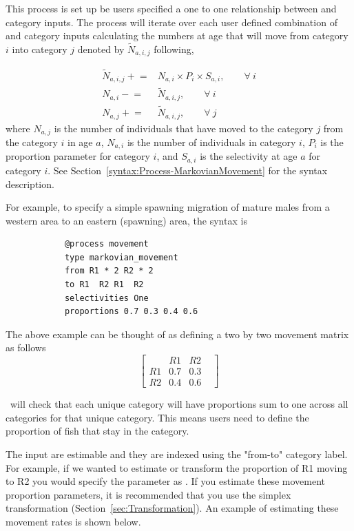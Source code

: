 This process is set up be users specified a one to one relationship between  and  category inputs. The process will iterate over each user defined combination of  and  category inputs calculating the numbers at age that will move from category \(i\) into category \(j\) denoted by \(\tilde{N}_{a,i,j}\) following,

\begin{align}
	\tilde{N}_{a,i,j} \mathrel{+}=& N_{a,i} \times P_i \times S_{a,i}, \qquad \forall \ i \\
	N_{a,i} \mathrel{-}=& \tilde{N}_{a,i,j}, \qquad \forall \ i \\
	N_{a,j} \mathrel{+}=& \tilde{N}_{a,i,j}, \qquad \forall \ j
\end{align}
where $N_{a,j}$ is the number of individuals that have moved to the  category $j$ from the  category $i$ in age $a$, $N_{a,i}$ is the number of individuals in category $i$, $P_i$ is the proportion parameter for category $i$, and $S_{a,i}$ is the selectivity at age $a$ for category $i$. See Section~\ref{syntax:Process-MarkovianMovement} for the syntax description. 


For example, to specify a simple spawning migration of mature males from a western area to an eastern (spawning) area, the syntax is

{\small{\begin{verbatim}
			@process movement
			type markovian_movement
			from R1 * 2 R2 * 2
			to R1  R2 R1  R2
			selectivities One
			proportions 0.7 0.3 0.4 0.6
\end{verbatim}}}

The above example can be thought of as defining a two by two movement matrix as follows
\[
\begin{bmatrix}
	& R1 & R2 & \\
	R1 & 0.7 & 0.3  \\
	R2 & 0.4  & 0.6 
\end{bmatrix}
\]

\CNAME\ will check that each unique  category will have proportions sum to one across all  categories for that unique  category. This means users need to define the proportion of fish that stay in the  category.

The input  are estimable and they are indexed using the "from-to" category label. For example, if we wanted to estimate or transform the proportion of R1 moving to R2 you would specify the parameter as . If you estimate these movement proportion parameters, it is recommended that you use the simplex transformation (Section~\ref{sec:Transformation}). An example of estimating these movement rates is shown below.

